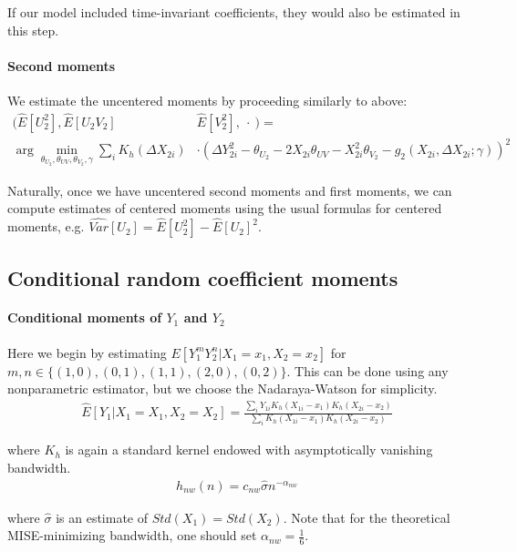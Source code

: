 If our model included time-invariant coefficients, they would also be estimated in this step.



\paragraph{Second moments} We estimate the uncentered moments by proceeding similarly to above:
\begin{align}
  (\widehat{E}[U_2^2], \widehat{E}[U_2 V_2] &\widehat{E}[V_2^2], \ \cdot \ ) = \\  
  \arg \min_{\theta_{U_2} , \theta_{UV}, \theta_{V_2}, \gamma}
\sum_{i} K_h(\Delta X_{2i}) &\cdot 
      \left( \Delta Y_{2i}^2 - \theta_{U_2} - 2X_{2i}\theta_{UV}  - X_{2i}^2\theta_{V_2} - g_2(X_{2i}, \Delta X_{2i}; \gamma) \right)^2
\end{align}

Naturally, once we have uncentered second moments and first moments, we can compute estimates of centered moments using the usual formulas for centered moments, e.g. $\widehat{Var}[U_2] = \widehat{E}[U_2^2] - \widehat{E}[U_2]^2$. 

\subsection*{Conditional random coefficient moments}



\paragraph{Conditional moments of $Y_1$ and $Y_2$} Here we begin by estimating $E[Y_1^{m} Y_2^{n}|X_1 = x_1, X_2 = x_2]$ for $m,n \in \{ (1,0), (0,1), (1,1), (2,0), (0,2)\}$. This can be done using any nonparametric estimator, but we choose the Nadaraya-Watson for simplicity.
\begin{align}
  \widehat{E}[Y_1|X_1 = X_1, X_2 = X_2] =
  \frac{\sum_i Y_{1i}K_h(X_{1i} - x_1) K_h(X_{2i} - x_2)}
  {\sum_i K_h(X_{1i} - x_1) K_h(X_{2i} - x_2)}
\end{align}

\noindent where $K_h$ is again a standard kernel endowed with asymptotically vanishing bandwidth.
\begin{align}
  h_{nw}(n) = c_{nw}\hat{\sigma} n^{-\alpha_{nw}}
\end{align}

\noindent where $\hat{\sigma}$ is an estimate of $Std(X_1) = Std(X_2)$. Note that for the theoretical MISE-minimizing bandwidth, one should set $\alpha_{nw} = \frac{1}{6}$. 

